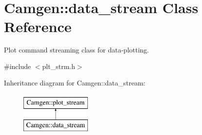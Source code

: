 \hypertarget{a00117}{\section{Camgen\-:\-:data\-\_\-stream Class Reference}
\label{a00117}
}


Plot command streaming class for data-\/plotting.  




{\ttfamily \#include $<$plt\-\_\-strm.\-h$>$}

Inheritance diagram for Camgen\-:\-:data\-\_\-stream\-:\begin{figure}[H]
\begin{center}
\leavevmode
\includegraphics[height=2.000000cm]{a00117}
\end{center}
\end{figure}
